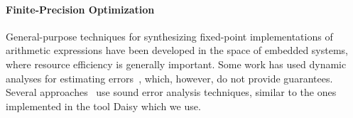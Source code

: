 
\paragraph{Finite-Precision Optimization}
General-purpose techniques for synthesizing fixed-point implementations of 
arithmetic expressions have been developed in the space of embedded systems,
where resource efficiency is generally important.
Some work has used dynamic analyses for estimating
errors~\cite{Gaffar2004,Mallik2007}, which, however, do not provide guarantees.
Several approaches~\cite{Lee2006,Osborne2007,Kinsman2009,Pang2011} use sound
error analysis techniques, similar to the ones implemented in the tool Daisy
which we use.
